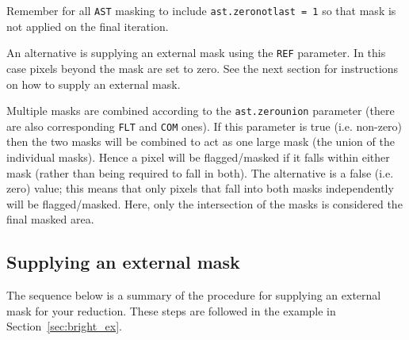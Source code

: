 \documentclass[twoside,11pt]{article}
\newcommand{\htmlref}[2]{#1}
\newcommand{\latexhtml}[2]{#1}
\newcommand{\xlabel}[1]{}
\renewcommand{\_}{\texttt{\symbol{95}}}
\newcommand{\cref}[3]{\latexhtml{#1~\ref{#2}}{\htmlref{#3}{#2}}}
\begin{document}
Remember for all \texttt{AST} masking to include
\texttt{ast.zero\_notlast = 1} so that mask is not applied on the
final iteration.

An alternative is supplying an external mask using the \texttt{REF}
parameter. In this case pixels beyond the mask are set to zero. See
the next section for instructions on how to supply an external mask.


Multiple masks are combined according to the \texttt{ast.zero\_union}
parameter (there are also corresponding \texttt{FLT} and \texttt{COM}
ones). If this parameter is true (i.e. non-zero) then the two masks
will be combined to act as one large mask (the union of the individual
masks). Hence a pixel will be flagged/masked if it falls within either
mask (rather than being required to fall in both). The alternative is
a false (i.e. zero) value; this means that only pixels that fall into
both masks independently will be flagged/masked. Here, only the
intersection of the masks is considered the final masked area.

\subsection{\xlabel{maskbe}Supplying an external mask}
\label{sec:maskbe}

The sequence below is a summary of the procedure for supplying an
external mask for your reduction. These steps are followed in the example
\cref{in Section}{sec:bright_ex}{Extended galactic sources}.
\end{document}

